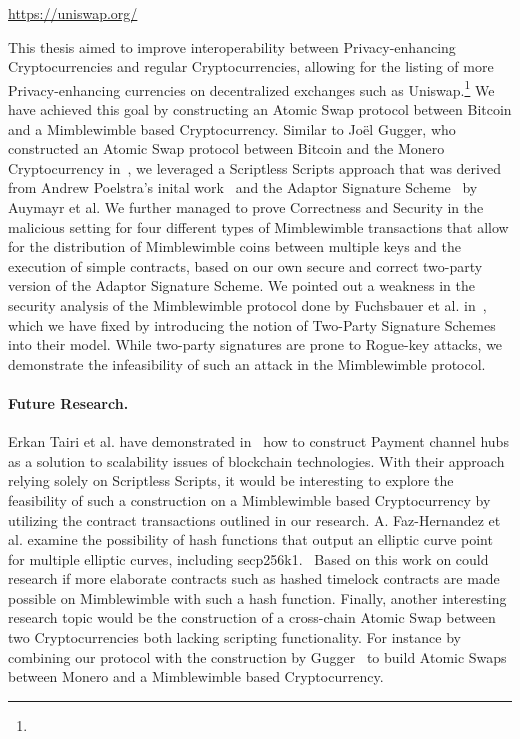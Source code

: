 \urldef{\urluniswp}\url{https://uniswap.org/}

This thesis aimed to improve interoperability between Privacy-enhancing Cryptocurrencies and regular Cryptocurrencies, allowing for the listing of more Privacy-enhancing currencies on decentralized exchanges such as Uniswap.\footnote{\urluniswp}
We have achieved this goal by constructing an Atomic Swap protocol between Bitcoin and a Mimblewimble based Cryptocurrency.
Similar to Joël Gugger, who constructed an Atomic Swap protocol between Bitcoin and the Monero Cryptocurrency in~\cite{gugger2020bitcoin}, we leveraged a Scriptless Scripts approach that was derived from Andrew Poelstra's inital work~\cite{poelstra2017scriptless} and the Adaptor Signature Scheme~\cite{aumayr2020bitcoinchannels} by Auymayr et al.
We further managed to prove Correctness and Security in the malicious setting for four different types of Mimblewimble transactions that allow for the distribution of Mimblewimble coins between multiple keys and the execution of simple contracts, based on our own secure and correct two-party version of the Adaptor Signature Scheme.
We pointed out a weakness in the security analysis of the Mimblewimble protocol done by Fuchsbauer et al. in~\cite{fuchsbauer2019aggregate}, which we have fixed by introducing the notion of Two-Party Signature Schemes into their model.
While two-party signatures are prone to Rogue-key attacks, we demonstrate the infeasibility of such an attack in the Mimblewimble protocol.

\paragraph{Future Research.} Erkan Tairi et al. have demonstrated in~\cite{tairi2019a2l} how to construct Payment channel hubs as a solution to scalability issues of blockchain technologies.
With their approach relying solely on Scriptless Scripts, it would be interesting to explore the feasibility of such a construction on a Mimblewimble based Cryptocurrency by utilizing the contract transactions outlined in our research.
A. Faz-Hernandez et al. examine the possibility of hash functions that output an elliptic curve point for multiple elliptic curves, including secp256k1.~\cite{hernandez2020hashing} Based on this work on could research if more elaborate contracts such as hashed timelock contracts are made possible on Mimblewimble with such a hash function.
Finally, another interesting research topic would be the construction of a cross-chain Atomic Swap between two Cryptocurrencies both lacking scripting functionality.
For instance by combining our protocol with the construction by Gugger~\cite{gugger2020bitcoin} to build Atomic Swaps between Monero and a Mimblewimble based Cryptocurrency.


